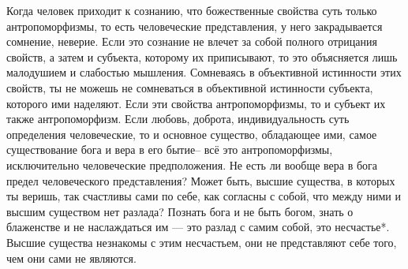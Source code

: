 \documentclass[12pt,oneside]{book}
\begin{document}
Когда человек приходит к сознанию, что божественные свойства суть только антропоморфизмы, то есть человеческие представления, у него закрадывается сомнение, неверие. Если это сознание не влечет за собой полного отрицания свойств, а затем и субъекта, которому их приписывают, то это объясняется лишь малодушием и слабостью мышления. Сомневаясь в объективной истинности этих свойств, ты не можешь не сомневаться в объективной истинности субъекта, которого ими наделяют. Если эти свойства антропоморфизмы, то и субъект их также антропоморфизм. Если любовь, доброта, индивидуальность суть определения человеческие, то и основное существо, обладающее ими, самое существование бога и вера в его бытие– всё это антропоморфизмы, исключительно человеческие предположения. Не есть ли вообще вера в бога предел человеческого представления? Может быть, высшие существа, в которых ты веришь, так счастливы сами по себе, как согласны с собой, что между ними и высшим существом нет разлада? Познать бога и не быть богом, знать о блаженстве и не наслаждаться им --- это разлад с самим собой, это несчастье*\let\svthefootnote\thefootnote\let\thefootnote\relax{}\let\thefootnote\svthefootnote. Высшие существа незнакомы с этим несчастьем, они не представляют себе того, чем они сами не являются.
\end{document}
